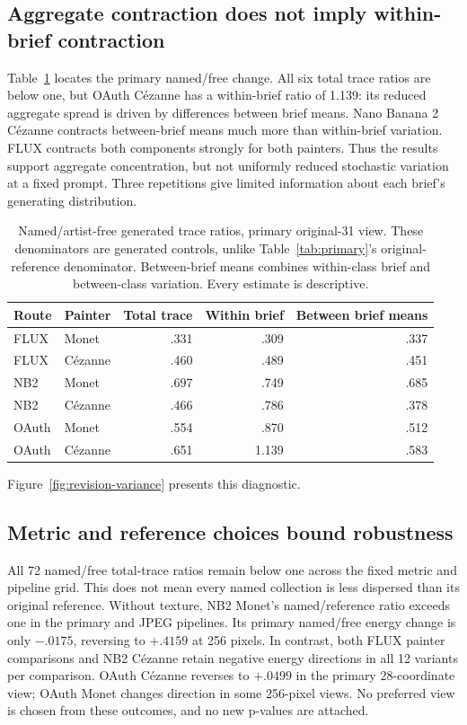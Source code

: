 \subsection{Aggregate contraction does not imply within-brief contraction}
Table~\ref{tab:decomposition} locates the primary named/free change. All six total
trace ratios are below one, but OAuth C\'ezanne has a within-brief ratio of 1.139:
its reduced aggregate spread is driven by differences between brief means.
Nano Banana 2 C\'ezanne contracts between-brief means much more than within-brief
variation. FLUX contracts both components strongly for both painters. Thus the
results support aggregate concentration, but not uniformly reduced stochastic
variation at a fixed prompt. Three repetitions give limited information about
each brief's generating distribution.

\begin{table}[ht]
\centering\small
\begin{tabular}{llrrr}\toprule
Route & Painter & Total trace & Within brief & Between brief means\\\midrule
FLUX & Monet & .331 & .309 & .337\\
FLUX & C\'ezanne & .460 & .489 & .451\\
NB2 & Monet & .697 & .749 & .685\\
NB2 & C\'ezanne & .466 & .786 & .378\\
OAuth & Monet & .554 & .870 & .512\\
OAuth & C\'ezanne & .651 & 1.139 & .583\\\bottomrule
\end{tabular}
\caption{Named/artist-free generated trace ratios, primary original-31 view.
These denominators are generated controls, unlike Table~\ref{tab:primary}'s
original-reference denominator. Between-brief means combines within-class brief
and between-class variation. Every estimate is descriptive.}
\label{tab:decomposition}\end{table}

Figure~\ref{fig:revision-variance} presents this diagnostic.

\subsection{Metric and reference choices bound robustness}
All 72 named/free total-trace ratios remain below one across the fixed metric and
pipeline grid. This does not mean every named collection is less dispersed than
its original reference. Without texture, NB2 Monet's named/reference ratio exceeds
one in the primary and JPEG pipelines. Its primary named/free energy change is
only $-.0175$, reversing to $+.4159$ at 256 pixels. In contrast, both FLUX painter
comparisons and NB2 C\'ezanne retain negative energy directions in all 12 variants
per comparison. OAuth C\'ezanne reverses to $+.0499$ in the primary 28-coordinate
view; OAuth Monet changes direction in some 256-pixel views. No preferred view
is chosen from these outcomes, and no new p-values are attached.

